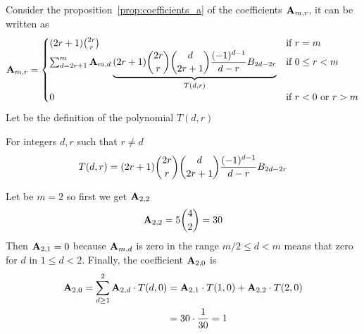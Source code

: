 Consider the proposition~\eqref{prop:coefficients_a} of the coefficients ${\mathbf{A}} \sb{m,r}$,
it can be written as
\begin{equation*}
    {\mathbf{A}} \sb{m,r} =
    \begin{cases}
    (2r+1)
        \binom{2r}{r} & \text{if } r=m \\
        \sum_{d=2r+1}^{m} {\mathbf{A}} \sb{m,d} \underbrace{(2r+1) \binom{2r}{r} \binom{d}{2r+1} \frac{(-1)^{d-1}}{d-r} {B}\sb{2d-2r}}_{T(d,r)} & \text{if } 0 \leq r<m \\
        0 & \text{if } r<0 \text{ or } r>m
    \end{cases}
\end{equation*}
Let be the definition of the polynomial $T(d,r)$
\begin{definition}[Polynomial $T(d,r)$]
    \label{def:polynomial-tdr}
    For integers $d,r$ such that $r \neq d$
    \begin{equation*}
        T(d,r) = (2r+1) \binom{2r}{r} \binom{d}{2r+1} \frac{(-1)^{d-1}}{d-r} {B}\sb{2d-2r}
    \end{equation*}
\end{definition}
\begin{example}
    Let be $m=2$ so first we get ${\mathbf{A}} \sb{2,2}$
    \begin{equation*}
        {\mathbf{A}} \sb{2,2} = 5\binom{4}{2}=30
    \end{equation*}
    Then ${\mathbf{A}} \sb{2,1} = 0$ because ${\mathbf{A}} \sb{m,d}$ is zero in the range $m/2 \leq d < m$ means that zero for $d$
    in $1 \leq d < 2$.
    Finally, the coefficient ${\mathbf{A}} \sb{2,0}$ is
    \begin{equation*}
        \begin{split}
            {\mathbf{A}} \sb{2,0}
            = \sum_{d \geq 1}^{2} {\mathbf{A}} \sb{2,d} \cdot T(d, 0)
            &= {\mathbf{A}} \sb{2,1} \cdot T(1, 0) + {\mathbf{A}} \sb{2,2} \cdot T(2, 0) \\
            &= 30 \cdot \frac{1}{30} = 1
        \end{split}
    \end{equation*}
\end{example}
